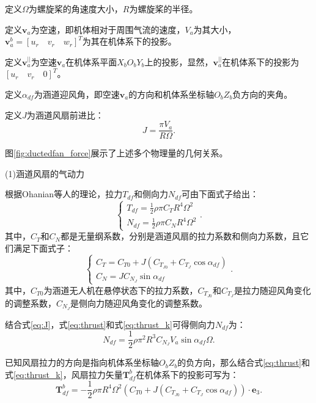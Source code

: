 定义$\Omega$为螺旋桨的角速度大小，$R$为螺旋桨的半径。

定义$\bm{v}_a$为空速，即机体相对于周围气流的速度，$V_a$为其大小，$\bm{v}_a^b = [u_r \quad v_r \quad w_r]^T$为其在机体系下的投影。

定义$\bm{v}_a^{||}$为空速$\bm{v}_a$在机体系平面$X_bO_bY_b$上的投影，显然，$\bm{v}_a^{||}$在机体系下的投影为$[u_r \quad v_r \quad 0]^T$。

定义$\alpha_{df}$为涵道迎风角，即空速$\bm{v}_a$的方向和机体系坐标轴$O_bZ_b$负方向的夹角。

定义$J$为涵道风扇前进比：
\begin{equation}
    J = \frac{\pi V_a}{R \Omega}.
    \label{eq:J}
\end{equation}

图\ref{fig:ductedfan_force}展示了上述多个物理量的几何关系。


(1)涵道风扇的气动力

根据Ohanian等人的理论，拉力$T_{df}$和侧向力$N_{df}$可由下面式子给出\cite{2012Nondimensional}：
\begin{equation}
    \begin{cases}
        T_{df} = \frac{1}{2}\rho \pi C_T R^4 \Omega^2 \\
        N_{df} = \frac{1}{2}\rho \pi C_N R^4 \Omega^2 
    \end{cases}.
    \label{eq:thrust}
\end{equation}
其中，$C_T$和$C_N$都是无量纲系数，分别是涵道风扇的拉力系数和侧向力系数，且它们满足下面式子\cite{2012Nondimensional}：
\begin{equation}
    \begin{cases}
        C_T = C_{T0} + J (C_{T_{J0}} + C_{T_J} \cos\alpha_{df}) \\
        C_N =  J C_{N_J} \sin\alpha_{df}
    \end{cases}.
    \label{eq:thrust_k}
\end{equation}
其中，$C_{T0}$为涵道无人机在悬停状态下的拉力系数，$C_{T_{J0}}$和$C_{T_J}$是拉力随迎风角变化的调整系数，$C_{N_J}$是侧向力随迎风角变化的调整系数。

结合式\eqref{eq:J}，式\eqref{eq:thrust}和式\eqref{eq:thrust_k}可得侧向力$N_{df}$为：
\begin{equation}
    N_{df} = \frac{1}{2}\rho \pi^2 R^3 C_{N_J} V_a \sin\alpha_{df} \Omega.
\end{equation}

已知风扇拉力的方向是指向机体系坐标轴$O_bZ_b$的负方向，那么结合式\eqref{eq:thrust}和式\eqref{eq:thrust_k}，风扇拉力矢量$\bm{T}_{df}^b$在机体系下的投影可写为：
\begin{equation}
    \bm{T}_{df}^b = -\frac{1}{2}\rho \pi R^4 \Omega^2 (C_{T0} + J (C_{T_{J0}} + C_{T_J} \cos\alpha_{df})) \cdot \bm{e}_3.
    \label{eq:T_df}
\end{equation}

